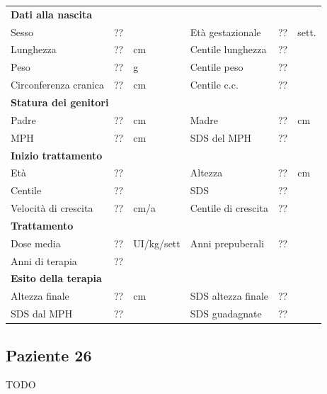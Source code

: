 \begin{table}[!h]
\begin{tabular}{lrllrl}
\toprule
\multicolumn{6}{l}{\textbf{Dati alla nascita}}\\
Sesso 		& \multicolumn{2}{l}{??} 	& Età gestazionale 		& ?? 		& sett.\\
Lunghezza 	& ?? 		& cm 				& Centile lunghezza		& ?? 		\\
Peso 		& ?? 		& g					& Centile peso			& ?? 		\\
Circonferenza cranica	& ?? 		& cm 	& Centile c.c.			& ?? \\
\midrule
\multicolumn{6}{l}{\textbf{Statura dei genitori}}\\
Padre 		& ?? & cm 	& Madre 				& ?? & cm \\
MPH 		& ?? & cm 	& SDS del MPH 			& ??\\
\midrule
\multicolumn{6}{l}{\textbf{Inizio trattamento}} \\
Età	& ?? & 		& Altezza 				& ?? & cm  \\
Centile & ?? 	 &		& SDS		& ?? \\
Velocità di crescita & ?? & cm/a	& Centile di crescita & ??\\
\midrule
\multicolumn{6}{l}{\textbf{Trattamento}} \\
Dose media		& ?? & UI/kg/sett & Anni prepuberali & ??\\
Anni di terapia & ??\\
\midrule
\multicolumn{6}{l}{\textbf{Esito della terapia}} \\
Altezza finale			& ?? & cm 	& SDS altezza finale		& ??\\
SDS dal MPH				& ?? &		& SDS guadagnate 			& ??\\
\bottomrule
\end{tabular}
\end{table}
\clearpage


\subsection*{Paziente 26}

TODO

